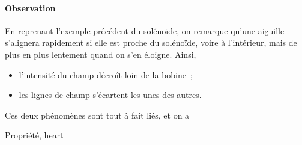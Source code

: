 \documentclass[../main/main.tex]{subfiles}
\begin{document}
\paragraph*{Observation}
En reprenant l'exemple précédent du solénoïde, on remarque qu'une aiguille
s'alignera rapidement si elle est proche du solénoïde, voire à l'intérieur, mais
de plus en plus lentement quand on s'en éloigne. Ainsi,
\begin{itemize}[label=$\diamond$, leftmargin=10pt]
	\item l'intensité du champ décroît loin de la bobine~;
	\item les lignes de champ s'écartent les unes des autres.
\end{itemize}
Ces deux phénomènes sont tout à fait liés, et on a
\begin{tprop}{Propriété, heart}
	\begin{center}
	\end{center}
\end{tprop}
\end{document}
